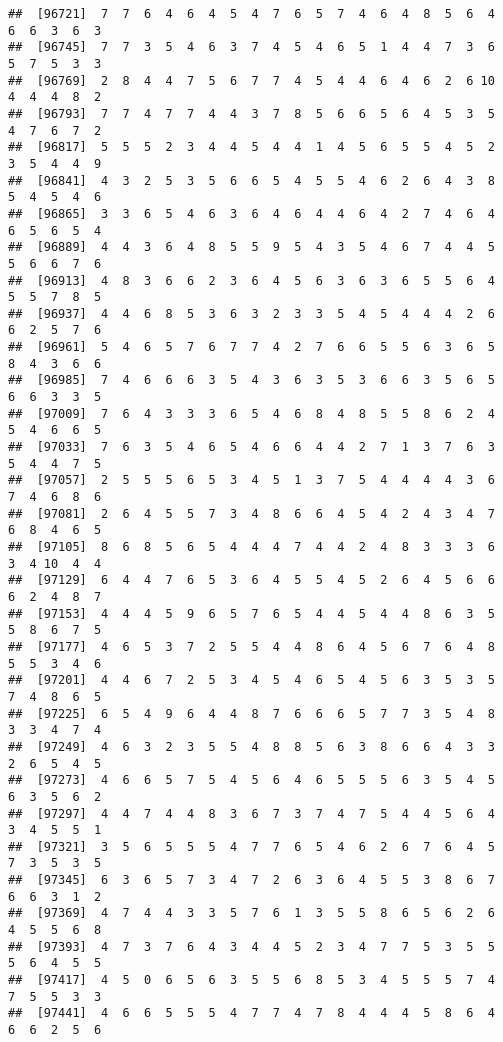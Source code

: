 \documentclass[
]{book}
\begin{document}
\begin{verbatim}
##  [96721]  7  7  6  4  6  4  5  4  7  6  5  7  4  6  4  8  5  6  4  6  6  3  6  3
##  [96745]  7  7  3  5  4  6  3  7  4  5  4  6  5  1  4  4  7  3  6  5  7  5  3  3
##  [96769]  2  8  4  4  7  5  6  7  7  4  5  4  4  6  4  6  2  6 10  4  4  4  8  2
##  [96793]  7  7  4  7  7  4  4  3  7  8  5  6  6  5  6  4  5  3  5  4  7  6  7  2
##  [96817]  5  5  5  2  3  4  4  5  4  4  1  4  5  6  5  5  4  5  2  3  5  4  4  9
##  [96841]  4  3  2  5  3  5  6  6  5  4  5  5  4  6  2  6  4  3  8  5  4  5  4  6
##  [96865]  3  3  6  5  4  6  3  6  4  6  4  4  6  4  2  7  4  6  4  6  5  6  5  4
##  [96889]  4  4  3  6  4  8  5  5  9  5  4  3  5  4  6  7  4  4  5  5  6  6  7  6
##  [96913]  4  8  3  6  6  2  3  6  4  5  6  3  6  3  6  5  5  6  4  5  5  7  8  5
##  [96937]  4  4  6  8  5  3  6  3  2  3  3  5  4  5  4  4  4  2  6  6  2  5  7  6
##  [96961]  5  4  6  5  7  6  7  7  4  2  7  6  6  5  5  6  3  6  5  8  4  3  6  6
##  [96985]  7  4  6  6  6  3  5  4  3  6  3  5  3  6  6  3  5  6  5  6  6  3  3  5
##  [97009]  7  6  4  3  3  3  6  5  4  6  8  4  8  5  5  8  6  2  4  5  4  6  6  5
##  [97033]  7  6  3  5  4  6  5  4  6  6  4  4  2  7  1  3  7  6  3  5  4  4  7  5
##  [97057]  2  5  5  5  6  5  3  4  5  1  3  7  5  4  4  4  4  3  6  7  4  6  8  6
##  [97081]  2  6  4  5  5  7  3  4  8  6  6  4  5  4  2  4  3  4  7  6  8  4  6  5
##  [97105]  8  6  8  5  6  5  4  4  4  7  4  4  2  4  8  3  3  3  6  3  4 10  4  4
##  [97129]  6  4  4  7  6  5  3  6  4  5  5  4  5  2  6  4  5  6  6  6  2  4  8  7
##  [97153]  4  4  4  5  9  6  5  7  6  5  4  4  5  4  4  8  6  3  5  5  8  6  7  5
##  [97177]  4  6  5  3  7  2  5  5  4  4  8  6  4  5  6  7  6  4  8  5  5  3  4  6
##  [97201]  4  4  6  7  2  5  3  4  5  4  6  5  4  5  6  3  5  3  5  7  4  8  6  5
##  [97225]  6  5  4  9  6  4  4  8  7  6  6  6  5  7  7  3  5  4  8  3  3  4  7  4
##  [97249]  4  6  3  2  3  5  5  4  8  8  5  6  3  8  6  6  4  3  3  2  6  5  4  5
##  [97273]  4  6  6  5  7  5  4  5  6  4  6  5  5  5  6  3  5  4  5  6  3  5  6  2
##  [97297]  4  4  7  4  4  8  3  6  7  3  7  4  7  5  4  4  5  6  4  3  4  5  5  1
##  [97321]  3  5  6  5  5  5  4  7  7  6  5  4  6  2  6  7  6  4  5  7  3  5  3  5
##  [97345]  6  3  6  5  7  3  4  7  2  6  3  6  4  5  5  3  8  6  7  6  6  3  1  2
##  [97369]  4  7  4  4  3  3  5  7  6  1  3  5  5  8  6  5  6  2  6  4  5  5  6  8
##  [97393]  4  7  3  7  6  4  3  4  4  5  2  3  4  7  7  5  3  5  5  5  6  4  5  5
##  [97417]  4  5  0  6  5  6  3  5  5  6  8  5  3  4  5  5  5  7  4  7  5  5  3  3
##  [97441]  4  6  6  5  5  5  4  7  7  4  7  8  4  4  4  5  8  6  4  6  6  2  5  6

\end{verbatim}
\end{document}
